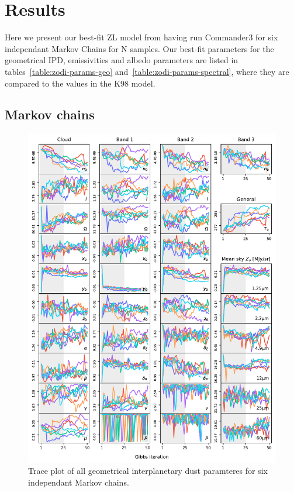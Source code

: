 \documentclass[twocolumn]{aa}
\begin{document}
\section{Results}\label{sect:improved-model}
Here we present our best-fit ZL model from having run Commander3 for six independant
Markov Chains for N samples. Our best-fit parameters for the geometrical IPD, emissivities 
and albedo parameters are listed in tables~\ref{table:zodi-params-geo} 
and~\ref{table:zodi-params-spectral}, where they are compared to the values in the K98 model.


\subsection{Markov chains}

\begin{figure}
    \centering
    \includegraphics[width=1\textwidth]{figs/total_trace.pdf}
    \caption{Trace plot of all geometrical interplanetary dust paramteres for six independant Markov chains.}
    \label{fig:trace-ipd}
\end{figure}
\end{document}
